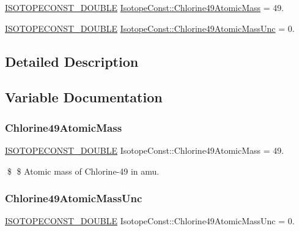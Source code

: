 \begin{DoxyCompactItemize}
\item 
\mbox{\hyperlink{group___isotope_const-_macros_ga8f45a7272ce02c0b4c65c44636ed719a}{I\+S\+O\+T\+O\+P\+E\+C\+O\+N\+S\+T\+\_\+\+D\+O\+U\+B\+LE}} \mbox{\hyperlink{group___isotope_const-_chlorine-_cl49_ga6f95ff13d5bf35b878ac017bd2343cdf}{Isotope\+Const\+::\+Chlorine49\+Atomic\+Mass}} = 49.
\item 
\mbox{\hyperlink{group___isotope_const-_macros_ga8f45a7272ce02c0b4c65c44636ed719a}{I\+S\+O\+T\+O\+P\+E\+C\+O\+N\+S\+T\+\_\+\+D\+O\+U\+B\+LE}} \mbox{\hyperlink{group___isotope_const-_chlorine-_cl49_ga587203b3caa09e1672489c8a48a258a5}{Isotope\+Const\+::\+Chlorine49\+Atomic\+Mass\+Unc}} = 0.
\end{DoxyCompactItemize}


\subsection{Detailed Description}


\subsection{Variable Documentation}
\mbox{\label{group___isotope_const-_chlorine-_cl49_ga6f95ff13d5bf35b878ac017bd2343cdf}} 
\subsubsection{\texorpdfstring{Chlorine49\+Atomic\+Mass}{Chlorine49AtomicMass}}
{\footnotesize\ttfamily \mbox{\hyperlink{group___isotope_const-_macros_ga8f45a7272ce02c0b4c65c44636ed719a}{I\+S\+O\+T\+O\+P\+E\+C\+O\+N\+S\+T\+\_\+\+D\+O\+U\+B\+LE}} Isotope\+Const\+::\+Chlorine49\+Atomic\+Mass = 49.}

\$ \$ Atomic mass of Chlorine-\/49 in amu. \mbox{\label{group___isotope_const-_chlorine-_cl49_ga587203b3caa09e1672489c8a48a258a5}} 
\subsubsection{\texorpdfstring{Chlorine49\+Atomic\+Mass\+Unc}{Chlorine49AtomicMassUnc}}
{\footnotesize\ttfamily \mbox{\hyperlink{group___isotope_const-_macros_ga8f45a7272ce02c0b4c65c44636ed719a}{I\+S\+O\+T\+O\+P\+E\+C\+O\+N\+S\+T\+\_\+\+D\+O\+U\+B\+LE}} Isotope\+Const\+::\+Chlorine49\+Atomic\+Mass\+Unc = 0.}

